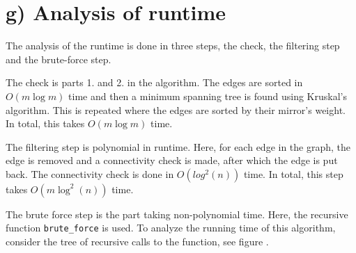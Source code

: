 \section*{g) Analysis of runtime}

The analysis of the runtime is done in three steps, the check, the filtering step and the brute-force step. 

The check is parts 1. and 2. in the algorithm. The edges are sorted in $O(m\log m)$ time and then a minimum spanning tree is found using Kruskal's algorithm. This is repeated where the edges are sorted by their mirror's weight. In total, this takes $O(m\log m)$ time. 

The filtering step is polynomial in runtime. Here, for each edge in the graph, the edge is removed and a connectivity check is made, after which the edge is put back. The connectivity check is done in $O(log^2(n))$ time. In total, this step takes $O(m\log^2(n))$ time. 

The brute force step is the part taking non-polynomial time. Here, the recursive function \texttt{brute_force} is used. To analyze the running time of this algorithm, consider the tree of recursive calls to the function, see figure . 





